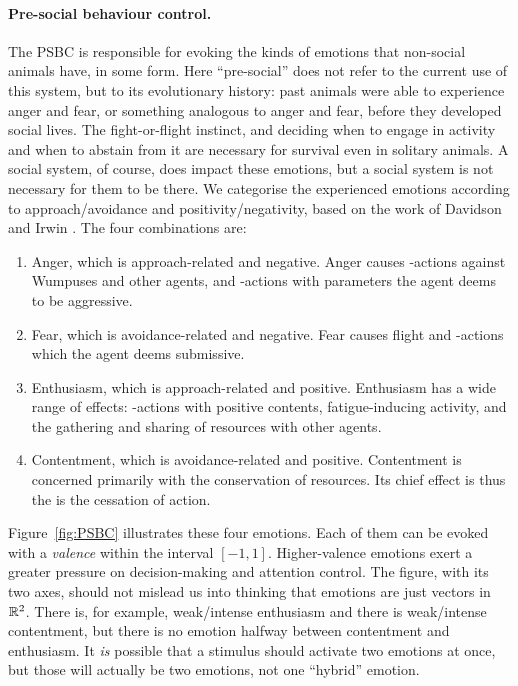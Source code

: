 \paragraph{Pre-social behaviour control.} The \textsc{PSBC} is responsible for evoking the kinds of emotions that non-social animals have, in some form. Here ``pre-social'' does not refer to the current use of this system, but to its evolutionary history: past animals were able to experience anger and fear, or something analogous to anger and fear, before they developed social lives. The fight-or-flight instinct, and deciding when to engage in activity and when to abstain from it are necessary for survival even in solitary animals. A social system, of course, does impact these emotions, but a social system is not necessary for them to be there.
We categorise the experienced emotions according to approach/avoidance and positivity/negativity, based on the work of Davidson and Irwin \cite{davidson1999}. The four combinations are:

\begin{enumerate}
	\item Anger, which is approach-related and negative. Anger causes -actions against Wumpuses and other agents, and -actions with parameters the agent deems to be aggressive.
	\item Fear, which is avoidance-related and negative. Fear causes flight and -actions which the agent deems submissive.
	\item Enthusiasm, which is approach-related and positive. Enthusiasm has a wide range of effects: -actions with positive contents, fatigue-inducing activity, and the gathering and sharing of resources with other agents.
	\item Contentment, which is avoidance-related and positive. Contentment is concerned primarily with the conservation of resources. Its chief effect is thus the is the cessation of action.
\end{enumerate}

Figure~\ref{fig:PSBC} illustrates these four emotions. Each of them can be evoked with a {\em valence} within the interval $[-1,1]$. Higher-valence emotions exert a greater pressure on decision-making and attention control. The figure, with its two axes, should not mislead us into thinking that emotions are just vectors in $\mathbb{R}^2$. There is, for example, weak/intense enthusiasm and there is weak/intense contentment, but there is no emotion halfway between contentment and enthusiasm. It {\em is} possible that a stimulus should activate two emotions at once, but those will actually be two emotions, not one ``hybrid'' emotion.

